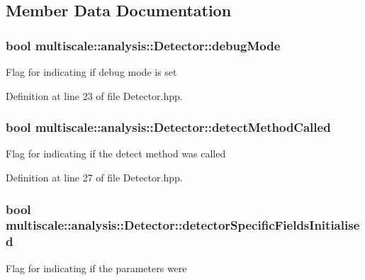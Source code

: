 \subsection{Member Data Documentation}
\hypertarget{classmultiscale_1_1analysis_1_1Detector_a4b42f796957efd6ee0b8cf7645494a65}{
\subsubsection[{debug\-Mode}]{\setlength{\rightskip}{0pt plus 5cm}bool multiscale\-::analysis\-::\-Detector\-::debug\-Mode\hspace{0.3cm}{\ttfamily [protected]}}}\label{classmultiscale_1_1analysis_1_1Detector_a4b42f796957efd6ee0b8cf7645494a65}
Flag for indicating if debug mode is set 

Definition at line 23 of file Detector.\-hpp.

\hypertarget{classmultiscale_1_1analysis_1_1Detector_ad565f471d9d7db7692da588ff0d6be2f}{
\subsubsection[{detect\-Method\-Called}]{\setlength{\rightskip}{0pt plus 5cm}bool multiscale\-::analysis\-::\-Detector\-::detect\-Method\-Called\hspace{0.3cm}{\ttfamily [protected]}}}\label{classmultiscale_1_1analysis_1_1Detector_ad565f471d9d7db7692da588ff0d6be2f}
Flag for indicating if the detect method was called 

Definition at line 27 of file Detector.\-hpp.

\hypertarget{classmultiscale_1_1analysis_1_1Detector_a172b91067670a14a7707f24dc218f2af}{
\subsubsection[{detector\-Specific\-Fields\-Initialised}]{\setlength{\rightskip}{0pt plus 5cm}bool multiscale\-::analysis\-::\-Detector\-::detector\-Specific\-Fields\-Initialised\hspace{0.3cm}{\ttfamily [protected]}}}\label{classmultiscale_1_1analysis_1_1Detector_a172b91067670a14a7707f24dc218f2af}
Flag for indicating if the parameters were 

